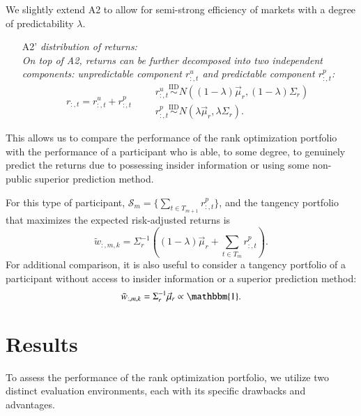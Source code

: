 \documentclass[3p,times,twocolumn]{elsarticle}
\begin{document}
We slightly extend A2 to allow for semi-strong efficiency of markets with a degree of predictability $\lambda$.
\begin{itemize}
    \item[A2']  \emph{distribution of returns:}\\
        \emph{
            On top of A2, returns can be further decomposed into two independent components: unpredictable component $r_{:,t}^{u}$ and predictable component $r_{:,t}^{p}$:
        }
        \begin{equation}
            r_{:,t}=r_{:,t}^{u}+r_{:,t}^{p} \qquad
            \begin{array}{l}
                r_{:,t}^{u} \overset{\mathrm{IID}}{\sim} N((1-\lambda)\vec{\mu}_{r}, (1-\lambda)\Sigma_{r}) \\
                r_{:,t}^{p} \overset{\mathrm{IID}}{\sim} N(\lambda\vec{\mu}_{r}, \lambda\Sigma_{r}).
            \end{array}
        \end{equation}
\end{itemize}
This allows us to compare the performance of the rank optimization portfolio with the performance of a participant who is able, to some degree, to genuinely predict the returns due to possessing insider information or using some non-public superior prediction method.

For this type of participant, $\mathcal{S}_{m}=\lbrace\sum_{t\in T_{m+1}}r_{:,t}^{p}\rbrace$, and the tangency portfolio that maximizes the expected risk-adjusted returns \cite[see e.g.,][]{kourtisSharpeRatioEstimated2016} is
\begin{equation}
    \tilde{w}_{:,m,k}=\Sigma_{r}^{-1}((1-\lambda) \vec{\mu}_{r} + \sum_{t\in T_{m}}r_{:,t}^{p}).
\end{equation}
For additional comparison, it is also useful to consider a tangency portfolio of a participant without access to insider information or a superior prediction method:
\begin{equation}
    \tilde{w}_{:,m,k}=\Sigma_{r}^{-1}\vec{\mu}_{r} \propto \mathbbm{1}.
\end{equation}

\section{Results}\label{section:results}

To assess the performance of the rank optimization portfolio, we utilize two distinct evaluation environments, each with its specific drawbacks and advantages.
\end{document}
